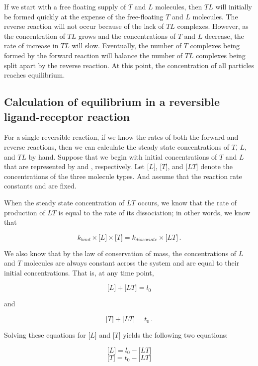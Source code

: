 If we start with a free floating supply of $T$ and $L$ molecules, then $TL$ will initially be formed quickly at the expense of the free-floating $T$ and $L$ molecules. The reverse reaction will not occur because of the lack of $TL$ complexes. However, as the concentration of $TL$ grows and the concentrations of  $T$ and $L$ decrease, the rate of increase in $TL$ will slow. Eventually, the number of $T$ complexes being formed by the forward reaction will balance the number of $TL$ complexes being split apart by the reverse reaction. At this point, the concentration of all particles reaches equilibrium.

\FloatBarrier
{}
\subsection{Calculation of equilibrium in a reversible ligand-receptor reaction}

For a single reversible reaction, if we know the rates of both the forward and reverse reactions, then we can calculate the steady state concentrations of $T$, $L$, and $TL$ by hand.  Suppose that we begin with initial concentrations of $T$ and $L$ that are represented by  and , respectively. Let $\text{[}L\text{]}$, $\text{[}T\text{]}$, and $\text{[}LT\text{]}$ denote the concentrations of the three molecule types. And assume that the reaction rate constants  and  are fixed.

When the steady state concentration of $LT$ occurs, we know that the rate of production of $LT$ is equal to the rate of its dissociation; in other words, we know that

$$k_{bind} \times \text{[}L\text{]} \times \text{[}T\text{]} = k_{dissociate} \times \text{[}LT\text{]} \,.$$

We also know that by the law of conservation of mass, the concentrations of $L$ and $T$ molecules are always constant across the system and are equal to their initial concentrations. That is, at any time point,

$$\text{[}L\text{]} + \text{[}LT\text{]} = l_0$$

and

$$\text{[}T\text{]} + \text{[}LT\text{]} = t_0 \,.$$

Solving these equations for $\text{[}L\text{]}$ and $\text{[}T\text{]}$ yields the following two equations:

$$\text{[}L\text{]} = l_0 - \text{[}LT\text{]}$$
$$\text{[}T\text{]} = t_0 - \text{[}LT\text{]}$$


